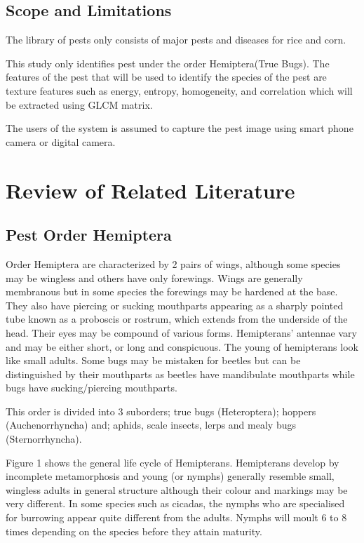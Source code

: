 \documentclass[journal]{./IEEE/IEEEtran}
\begin{document}
\subsection{Scope and Limitations}
The library of pests only consists of major pests and diseases for rice and corn.

This study only identifies pest under the order Hemiptera(True Bugs). The features of the pest that will be used to identify the species of the pest are texture features such as energy, entropy, homogeneity, and correlation which will be extracted using GLCM matrix.

The users of the system is assumed to capture the pest image using smart phone camera or digital camera.

\section{Review of Related Literature}

\subsection{Pest Order Hemiptera}
		Order Hemiptera are characterized by 2 pairs of wings, although some species may be wingless and others have only forewings. Wings are generally membranous but in some species the forewings may be hardened at the base. They also have piercing or sucking mouthparts appearing as a sharply pointed tube known as a proboscis or rostrum, which extends from the underside of the head. Their eyes may be compound of various forms. Hemipterans' antennae vary and may be either short, or long and conspicuous. The young of hemipterans look like small adults. Some bugs may be mistaken for beetles but can be distinguished by their mouthparts as beetles have mandibulate mouthparts while bugs have sucking/piercing mouthparts.

		This order is divided into 3 suborders; true bugs (Heteroptera); hoppers (Auchenorrhyncha) and; aphids, scale insects, lerps and mealy bugs (Sternorrhyncha).

		Figure 1 shows the general life cycle of Hemipterans. Hemipterans develop by incomplete metamorphosis and young (or nymphs) generally resemble small, wingless adults in general structure although their colour and markings may be very different. In some species such as cicadas, the nymphs who are specialised for burrowing appear quite different from the adults. Nymphs will moult 6 to 8 times depending on the species before they attain maturity.
\end{document}
